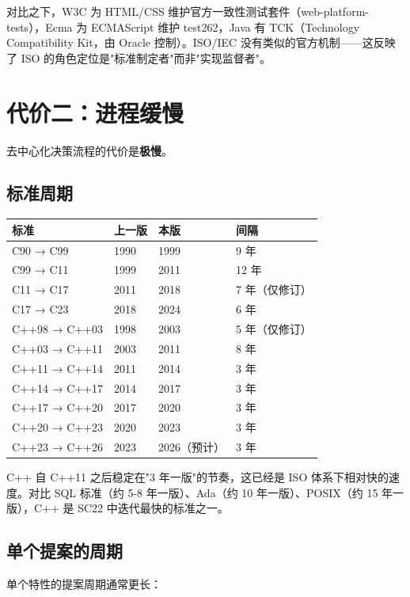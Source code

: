 \documentclass[12pt,a4paper,fontset=fandol]{ctexbook}
\begin{document}
对比之下，W3C 为 HTML/CSS 维护官方一致性测试套件（web-platform-tests），Ecma 为 ECMAScript 维护 test262，Java 有 TCK（Technology Compatibility Kit，由 Oracle 控制）。ISO/IEC 没有类似的官方机制——这反映了 ISO 的角色定位是"标准制定者"而非"实现监督者"。

\section{代价二：进程缓慢}

去中心化决策流程的代价是\textbf{极慢}。

\subsection{标准周期}

\begin{center}
\small
\begin{tabularx}{\textwidth}{@{}l l l X@{}}
\toprule
\textbf{标准} & \textbf{上一版} & \textbf{本版} & \textbf{间隔} \\
\midrule
C90 → C99 & 1990 & 1999 & 9 年 \\
C99 → C11 & 1999 & 2011 & 12 年 \\
C11 → C17 & 2011 & 2018 & 7 年（仅修订）\\
C17 → C23 & 2018 & 2024 & 6 年 \\
C++98 → C++03 & 1998 & 2003 & 5 年（仅修订）\\
C++03 → C++11 & 2003 & 2011 & 8 年 \\
C++11 → C++14 & 2011 & 2014 & 3 年 \\
C++14 → C++17 & 2014 & 2017 & 3 年 \\
C++17 → C++20 & 2017 & 2020 & 3 年 \\
C++20 → C++23 & 2020 & 2023 & 3 年 \\
C++23 → C++26 & 2023 & 2026（预计） & 3 年 \\
\bottomrule
\end{tabularx}
\end{center}

C++ 自 C++11 之后稳定在"3 年一版"的节奏，这已经是 ISO 体系下相对快的速度。对比 SQL 标准（约 5-8 年一版）、Ada（约 10 年一版）、POSIX（约 15 年一版），C++ 是 SC22 中迭代最快的标准之一。

\subsection{单个提案的周期}

单个特性的提案周期通常更长：
\end{document}
